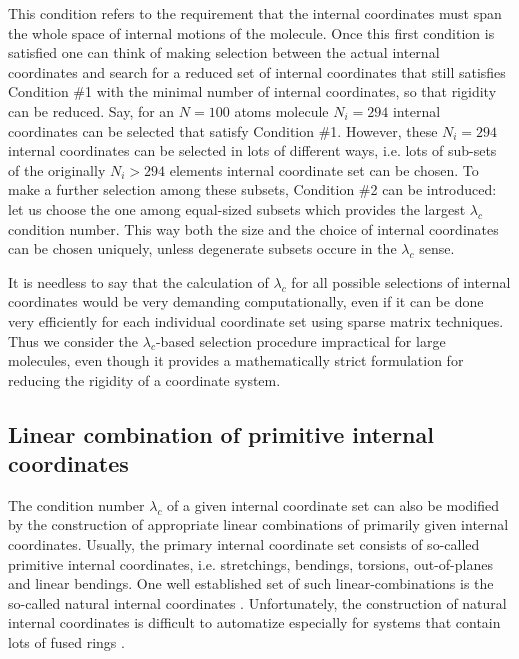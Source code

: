 \documentclass[prl,aps,preprint,superbib,12pt]{revtex4}
\begin{document}
This condition refers to the requirement
that the internal coordinates must span the whole space 
of internal motions of the molecule.
Once this first condition is satisfied one can think of making
selection between the actual internal coordinates and search
for a reduced set of internal coordinates that still satisfies 
Condition \#1 with the minimal number of internal coordinates, so that
rigidity can be reduced.
Say, for an $N=100$ atoms molecule $N_{i}=294$ internal coordinates
can be selected that satisfy Condition \#1. However, these $N_{i}=294$
internal coordinates can be selected in lots of different ways,
i.e. lots of sub-sets of the originally $N_{i}>294$ elements internal
coordinate set can be chosen. To make a further selection
among these subsets, Condition \#2 can be introduced:
let us choose the one among equal-sized subsets which provides the
largest $\lambda_{c}$ condition number. This way both
the size and the choice of internal coordinates can be chosen
uniquely, unless degenerate subsets occure in the $\lambda_{c}$ sense.

It is needless to say that the calculation of $\lambda_{c}$
for all possible selections of internal coordinates would be 
very demanding computationally, even if it can be done very efficiently
for each individual coordinate set using sparse matrix techniques.
Thus we consider the $\lambda_{c}$-based
selection procedure impractical for large molecules, even though it
provides a mathematically strict formulation for reducing the rigidity
of a coordinate system.

\subsection{Linear combination of primitive internal coordinates}
The condition number $\lambda_{c}$ of a given internal coordinate set
can also be modified by the construction of appropriate linear 
combinations of primarily given internal coordinates. Usually, the
primary internal coordinate set consists of so-called primitive
internal coordinates, i.e. stretchings, bendings, torsions,
out-of-planes and linear bendings. One well established set of such
linear-combinations is the so-called natural internal coordinates
\cite{GFogarasi92,MvonArnim99}. Unfortunately, the construction
of natural internal coordinates is difficult to 
automatize especially for systems that contain
lots of fused rings \cite{BPaizs00}. 
\end{document}
